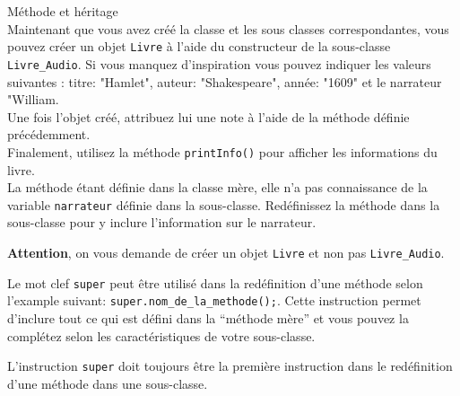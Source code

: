 \begin{Exercice}[5 minutes] Méthode et héritage \\

Maintenant que vous avez créé la classe et les sous classes correspondantes, vous pouvez créer un objet \lstinline{Livre} à l'aide du constructeur de la sous-classe \lstinline{Livre_Audio}. 
Si vous manquez d'inspiration vous pouvez indiquer les valeurs suivantes : titre: "Hamlet", auteur: "Shakespeare", année: "1609" et le narrateur "William.\\

Une fois l'objet créé, attribuez lui une note à l'aide de la méthode définie précédemment.\\ 

Finalement, utilisez la méthode \lstinline{printInfo()} pour afficher les informations du livre.\\

La méthode étant définie dans la classe mère, elle n'a pas connaissance de la variable \lstinline{narrateur} définie dans la sous-classe. Redéfinissez la méthode dans la sous-classe pour y inclure l'information sur le narrateur. \\

\begin{conseil}
\textbf{Attention}, on vous demande de créer un objet \lstinline{Livre} et non pas \lstinline{Livre_Audio}.

Le mot clef \lstinline{super} peut être utilisé dans la redéfinition d'une méthode selon l'example suivant: \lstinline{super.nom_de_la_methode();}. Cette instruction permet  d'inclure tout ce qui est défini dans la ``méthode mère'' et vous pouvez la complétez selon les caractéristiques de votre sous-classe.

L'instruction \lstinline{super} doit toujours être la première instruction dans le redéfinition d'une méthode dans une sous-classe. 
\end{conseil}

\begin{solution}
	
	
\end{solution}

\end{Exercice}


